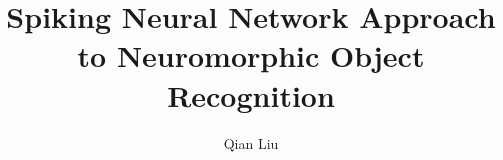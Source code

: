 \documentclass[12pt,PhD,twoside]{muthesis}
\begin{document}

\title{Spiking Neural Network Approach to Neuromorphic Object Recognition} %
\author{Qian Liu}

\beforeabstract



{}














%

\end{document}

